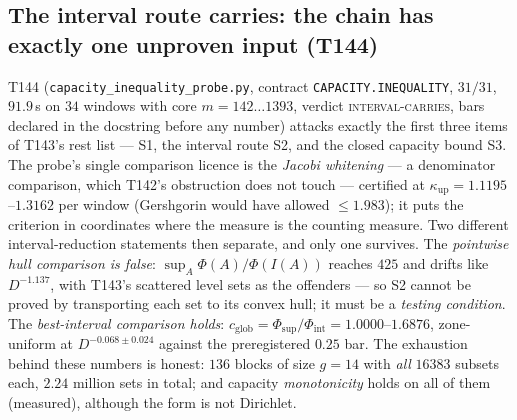 \documentclass[11pt,a4paper]{article}
\begin{document}
\subsection{The interval route carries: the chain has exactly one unproven input (T144)}
T144 (\texttt{capacity\_inequality\_probe.py}, contract \texttt{CAPACITY.INEQUALITY}, $31/31$,
$91.9$\,s on $34$ windows with core $m=142\ldots1393$, verdict \textsc{interval-carries}, bars
declared in the docstring before any number) attacks exactly the first three items of T143's
rest list --- S1, the interval route S2, and the closed capacity bound S3. The probe's single
comparison licence is the \emph{Jacobi whitening} --- a denominator comparison, which T142's
obstruction does not touch --- certified at $\kappa_{\mathrm{up}}=1.1195$--$1.3162$ per window
(Gershgorin would have allowed $\le1.983$); it puts the criterion in coordinates where the
measure is the counting measure. Two different interval-reduction statements then separate, and
only one survives. The \emph{pointwise hull comparison is false}:
$\sup_A\Phi(A)/\Phi(I(A))$ reaches $425$ and drifts like $D^{-1.137}$, with T143's scattered
level sets as the offenders --- so S2 cannot be proved by transporting each set to its convex
hull; it must be a \emph{testing condition}. The \emph{best-interval comparison holds}:
$c_{\mathrm{glob}}=\Phi_{\sup}/\Phi_{\mathrm{int}}=1.0000$--$1.6876$, zone-uniform at
$D^{-0.068\pm0.024}$ against the preregistered $0.25$ bar. The exhaustion behind these numbers
is honest: $136$ blocks of size $g=14$ with \emph{all} $16383$ subsets each, $2.24$ million
sets in total; and capacity \emph{monotonicity} holds on all of them (measured), although the
form is not Dirichlet.
\end{document}
